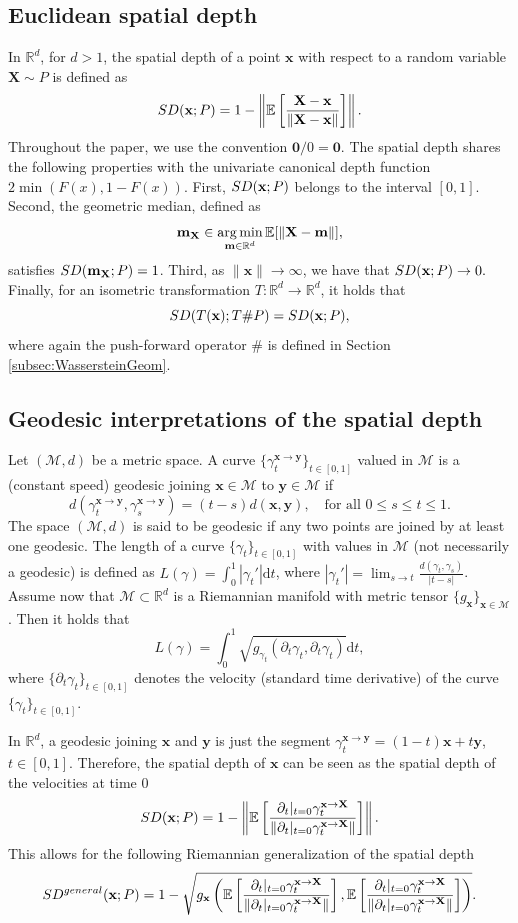 \documentclass{imsart}
\numberwithin{equation}{section}
\def\R{\mathbb{R}}
\def\E{\mathbb{E}}
\def\x{\mathbf{x}}
\def\y{\mathbf{y}}
\def\X{\mathbf{X}}
\DeclareMathOperator*{\argmin}{arg\,min}
\def\E{\mathbb E}
\def\x{\mathbf x}
\def\y{\mathbf y}
\begin{document}
\subsection{Euclidean spatial depth}\label{subsect:Euclidean}
In $\R^d$, for $d>1$, the spatial depth of a point $\x$ with respect to a random variable $\X\sim P$ is defined as 
$$   \rm SD(\x; P)=1-\left\|\E\left[\frac{\X-\x}{\|\X-\x\|}\right]\right\|.$$
Throughout the paper, we use the convention $\mathbf{0}/0 = \mathbf{0}$.
The spatial depth shares the following properties with the univariate canonical depth function \( 2\min(F(x), 1-F(x)) \). First, \(  \rm SD(\x; P) \) belongs to the interval \([0,1]\). Second, the geometric median, defined as 
\[
{\bf m}_{\X} \in \argmin_{{\bf m} \in \mathbb{R}^d} \E[\|\X - {\bf m}\|],
\]
satisfies \(  \rm SD({\bf m}_{\X}; P) = 1 \). Third, as \( \|\x\| \to \infty \), we have that 
\(
\rm SD(\x; P) \to 0.
\)
Finally, for an isometric  transformation \(T:\R^d\to \R^d\), it holds that 
\[
\rm SD(T(\x); T\# P) 
=  \rm SD(\x; P),
\]
where again the push-forward operator $\#$ is defined in Section \ref{subsec:WassersteinGeom}.

\subsection{Geodesic interpretations of the spatial depth}\label{subsec:Geodesic}
Let $(\mathcal{M}, d) $ be a metric space. A curve $\{\gamma_t^{\x\to \y}\}_{t\in [0,1]}$
valued in $\mathcal{M}$
is a (constant speed) geodesic joining $\x\in \mathcal{M}$ to $\y\in \mathcal{M}$ if   
$$ d(\gamma_t^{\x\to \y},\gamma_s^{\x\to \y})=(t-s) d(\x,\y), \quad \text{for all } 0\leq s\leq t\leq 1. $$
The space $(\mathcal{M}, d) $ is said to be geodesic if any two points are joined by at least one geodesic. The length of a curve $\{\gamma_t\}_{t\in [0,1]}$
with values in $\mathcal{M}$ (not necessarily a geodesic)
is defined as 
$ L(\gamma)= \int_{0}^1 | \gamma_t' | \mathrm{d} t $, where 
$ | \gamma_t' | = \lim_{s\to t}\frac{d(\gamma_t,\gamma_s)}{|t-s|}$.  Assume now that $\mathcal{M}\subset \R^d$ is a Riemannian manifold with metric tensor $\{g_{\x}\}_{\x\in \mathcal{M}}$. Then it holds that 
$$ L(\gamma) =\int_{0}^1 \sqrt{g_{\gamma_t}(\partial_t \gamma_t,\partial_t \gamma_t)} \mathrm{d}t, $$
where $ \{\partial_t \gamma_t\}_{t\in [0,1]}$ denotes the velocity (standard time derivative) of the curve $\{\gamma_t\}_{t\in [0,1]}$. 

In $\R^d$, a geodesic joining $\x$ and $\y$ is just the segment $\gamma_{t}^{\x\to \y}=(1-t)\x+ t \y $, $t\in [0,1]$. Therefore, the spatial depth of $\x$ can be seen as the spatial depth of the velocities at time $0$
$$   \rm SD(\x; P)=1-\left\|\E\left[\frac{\partial_t\vert_{t=0} \gamma_{t}^{\x\to \X}}{\|\partial_t\vert_{t=0} \gamma_{t}^{\x\to \X}\|}\right]\right\|.$$
This allows for the following Riemannian generalization 
of the spatial depth
$$   \rm SD^{general}(\x; P)=1-\sqrt{g_{\x}\left(\E\left[\frac{\partial_t\vert_{t=0} \gamma_{t}^{\x\to \X}}{\|\partial_t\vert_{t=0} \gamma_{t}^{\x\to \X}\|}\right], \E\left[\frac{\partial_t\vert_{t=0} \gamma_{t}^{\x\to \X}}{\|\partial_t\vert_{t=0} \gamma_{t}^{\x\to \X}\|}\right] \right)}.$$
\end{document}
